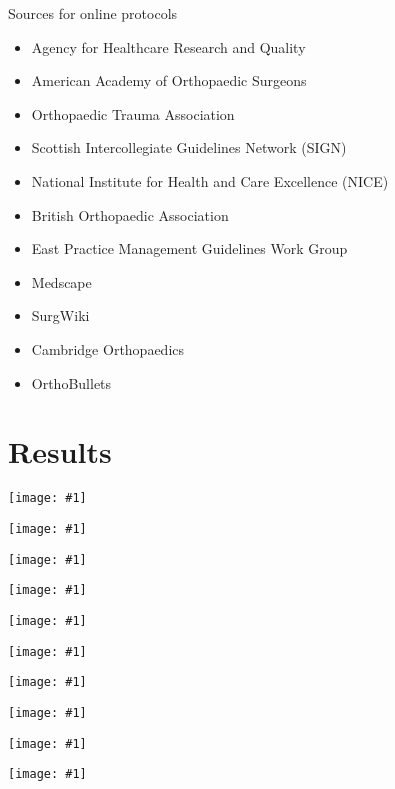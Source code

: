 \documentclass{beamer}
\newcommand*{\solo}[1]{\centering\texttt{[image: \#1]}}
\begin{document}
\begin{frame}{Sources for online protocols}
    \begin{itemize}
        \item Agency for Healthcare Research and Quality
        \item American Academy of Orthopaedic Surgeons
        \item Orthopaedic Trauma Association
        \item Scottish Intercollegiate Guidelines Network (SIGN)
        \item National Institute for Health and Care Excellence (NICE)
        \item British Orthopaedic Association
        \item East Practice Management Guidelines Work Group
        \item Medscape
        \item SurgWiki
        \item Cambridge Orthopaedics
        \item OrthoBullets
    \end{itemize}
\end{frame}

\section{Results}
\begin{frame}
    \solo{F1.jpg}
\end{frame}

\begin{frame}
    \solo{T1.pdf}
\end{frame}

\begin{frame}
    \solo{T2.pdf}
\end{frame}

\begin{frame}
    \solo{T3.pdf}
\end{frame}

\begin{frame}
    \solo{T4.pdf}
\end{frame}

\begin{frame}
    \solo{T5.pdf}
\end{frame}

\begin{frame}
    \solo{T6.pdf}
\end{frame}

\begin{frame}
    \solo{E1.pdf}
\end{frame}

\begin{frame}
    \solo{E2.pdf}
\end{frame}

\begin{frame}
    \solo{E3.pdf}
\end{frame}
\end{document}
